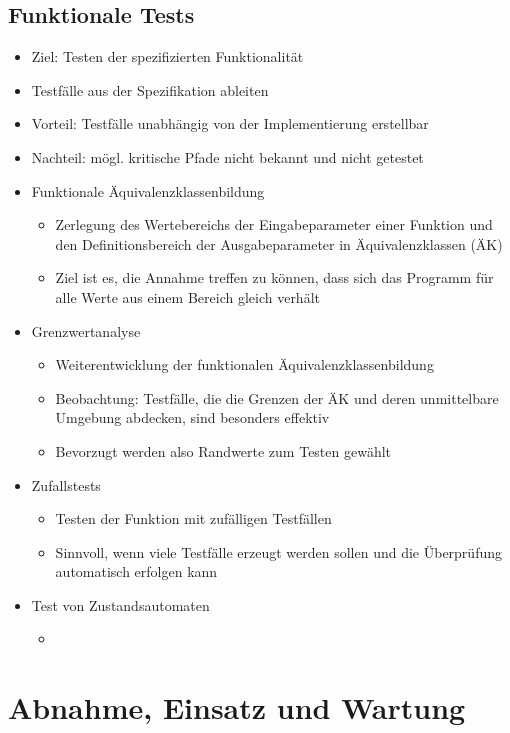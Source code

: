 \documentclass{article}
\begin{document}
\subsection{Funktionale Tests}
\begin{itemize}
  \item Ziel: Testen der spezifizierten Funktionalität
  \item Testfälle aus der Spezifikation ableiten
  \item Vorteil: Testfälle unabhängig von der Implementierung erstellbar
  \item Nachteil: mögl. kritische Pfade nicht bekannt und nicht getestet
  \item Funktionale Äquivalenzklassenbildung
  \begin{itemize}
    \item Zerlegung des Wertebereichs der Eingabeparameter einer Funktion und den Definitionsbereich der Ausgabeparameter in Äquivalenzklassen (ÄK)
    \item Ziel ist es, die Annahme treffen zu können, dass sich das Programm für alle Werte aus einem Bereich gleich verhält  
  \end{itemize}
  \item Grenzwertanalyse
  \begin{itemize}
    \item Weiterentwicklung der funktionalen Äquivalenzklassenbildung
    \item Beobachtung: Testfälle, die die Grenzen der ÄK und deren unmittelbare Umgebung abdecken, sind besonders effektiv
    \item Bevorzugt werden also Randwerte zum Testen gewählt
  \end{itemize}
  \item Zufallstests
  \begin{itemize}
    \item Testen der Funktion mit zufälligen Testfällen
    \item Sinnvoll, wenn viele Testfälle erzeugt werden sollen und die Überprüfung automatisch erfolgen kann
  \end{itemize}
  \item Test von Zustandsautomaten
  \begin{itemize}
    \item 
  \end{itemize}
\end{itemize}

\section{Abnahme, Einsatz und Wartung}
\end{document}
